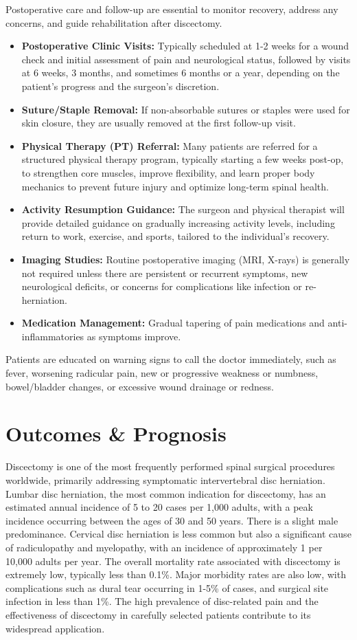 Postoperative care and follow-up are essential to monitor recovery, address any concerns, and guide rehabilitation after discectomy.

\begin{itemize}
  \item \textbf{Postoperative Clinic Visits:} Typically scheduled at 1-2 weeks for a wound check and initial assessment of pain and neurological status, followed by visits at 6 weeks, 3 months, and sometimes 6 months or a year, depending on the patient's progress and the surgeon's discretion.
  \item \textbf{Suture/Staple Removal:} If non-absorbable sutures or staples were used for skin closure, they are usually removed at the first follow-up visit.
  \item \textbf{Physical Therapy (PT) Referral:} Many patients are referred for a structured physical therapy program, typically starting a few weeks post-op, to strengthen core muscles, improve flexibility, and learn proper body mechanics to prevent future injury and optimize long-term spinal health.
  \item \textbf{Activity Resumption Guidance:} The surgeon and physical therapist will provide detailed guidance on gradually increasing activity levels, including return to work, exercise, and sports, tailored to the individual's recovery.
  \item \textbf{Imaging Studies:} Routine postoperative imaging (MRI, X-rays) is generally not required unless there are persistent or recurrent symptoms, new neurological deficits, or concerns for complications like infection or re-herniation.
\item \textbf{Medication Management:} Gradual tapering of pain medications and anti-inflammatories as symptoms improve.
\end{itemize}
Patients are educated on warning signs to call the doctor immediately, such as fever, worsening radicular pain, new or progressive weakness or numbness, bowel/bladder changes, or excessive wound drainage or redness.

\section*{Outcomes \& Prognosis}
Discectomy is one of the most frequently performed spinal surgical procedures worldwide, primarily addressing symptomatic intervertebral disc herniation. Lumbar disc herniation, the most common indication for discectomy, has an estimated annual incidence of 5 to 20 cases per 1,000 adults, with a peak incidence occurring between the ages of 30 and 50 years. There is a slight male predominance. Cervical disc herniation is less common but also a significant cause of radiculopathy and myelopathy, with an incidence of approximately 1 per 10,000 adults per year. The overall mortality rate associated with discectomy is extremely low, typically less than 0.1\%. Major morbidity rates are also low, with complications such as dural tear occurring in 1-5\% of cases, and surgical site infection in less than 1\%. The high prevalence of disc-related pain and the effectiveness of discectomy in carefully selected patients contribute to its widespread application.

